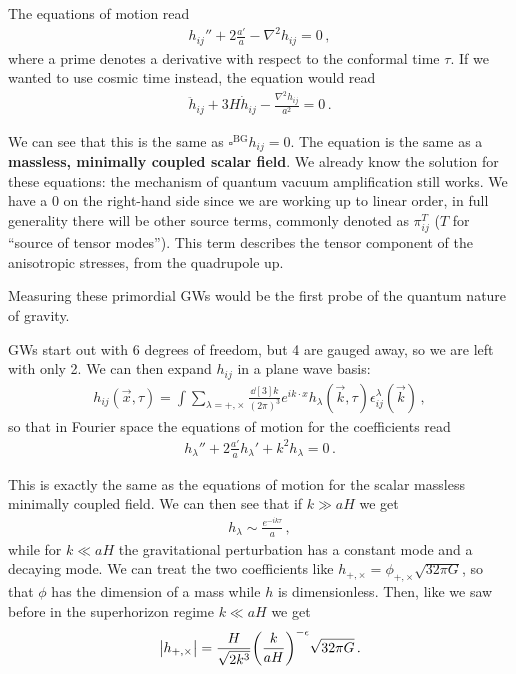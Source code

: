 \documentclass[main.tex]{subfiles}
\begin{document}
The equations of motion read 
%
\begin{align}
h_{ij}'' + 2 \frac{a'}{a} - \nabla^2 h_{ij} = 0
\,,
\end{align}
%
where a prime denotes a derivative with respect to the conformal time \(\tau \).
If we wanted to use cosmic time instead, the equation would read 
%
\begin{align}
\ddot{h}_{ij} + 3 H \dot{h}_{ij} - \frac{\nabla^2 h_{ij}}{a^2} = 0
\,.
\end{align}

We can see that this is the same as \(\square^{\text{BG}} h_{ij} = 0\). The equation is the same as a \textbf{massless, minimally coupled scalar field}. 
We already know the solution for these equations: the mechanism of quantum vacuum amplification still works. 
We have a 0 on the right-hand side since we are working up to linear order, in full generality there will be other source terms, commonly denoted as \(\pi^{T}_{ij}\) (\(T\) for ``source of tensor modes''). 
This term describes the tensor component of the anisotropic stresses, from the quadrupole up.

Measuring these primordial GWs would be the first probe of the quantum nature of gravity.

GWs start out with 6 degrees of freedom, but 4 are gauged away, so we are left with only 2. 
We can then expand \(h_{ij}\) in a plane wave basis: 
%
\begin{align}
h_{ij} (\vec{x}, \tau )
= \int  \sum_{\lambda = +, \times }
\frac{ \dd[3]{k}}{(2 \pi )^3}
e^{i k \cdot x}
h_\lambda (\vec{k}, \tau ) \epsilon^\lambda_{ij} (\vec{k})
\,,
\end{align}
%
so that in Fourier space the equations of motion for the coefficients read
%
\begin{align}
h_\lambda'' + 2 \frac{a'}{a} h_\lambda' + k^2 h_\lambda = 0
\,.
\end{align}

This is exactly the same as the equations of motion for the scalar massless minimally coupled field. 
We can then see that if \(k \gg aH\) we get 
%
\begin{align}
h_\lambda \sim \frac{e^{-ik \tau }}{a}
\,,
\end{align}
%
while for \(k \ll aH\) the gravitational perturbation has a constant mode and a decaying mode. 
We can treat the two coefficients like \(h_{+, \times } = \phi_{+, \times } \sqrt{32 \pi G}\), 
so that \(\phi \) has the dimension of a mass while \(h\) is dimensionless. 
Then, like we saw before in the superhorizon regime \(k\ll aH\) we get
%
\begin{align}
\abs{h_{+, \times }} = \frac{H}{\sqrt{2 k^3}}
\qty( \frac{k}{aH})^{-\epsilon } \sqrt{32 \pi G}
\,.
\end{align}
\end{document}
